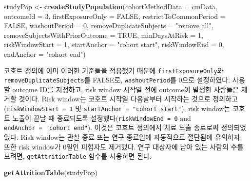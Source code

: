 \documentclass[11pt]{book}
\newenvironment{Shaded}{\begin{snugshade}}{\end{snugshade}}
\newcommand{\KeywordTok}[1]{\textcolor[rgb]{0.13,0.29,0.53}{\textbf{#1}}}
\newcommand{\DataTypeTok}[1]{\textcolor[rgb]{0.13,0.29,0.53}{#1}}
\newcommand{\DecValTok}[1]{\textcolor[rgb]{0.00,0.00,0.81}{#1}}
\newcommand{\StringTok}[1]{\textcolor[rgb]{0.31,0.60,0.02}{#1}}
\newcommand{\OtherTok}[1]{\textcolor[rgb]{0.56,0.35,0.01}{#1}}
\newcommand{\NormalTok}[1]{#1}
\theoremstyle{definition}
\theoremstyle{definition}
\theoremstyle{definition}
\theoremstyle{remark}
\begin{document}
\begin{Shaded}
\begin{Highlighting}[]
\NormalTok{studyPop <-}\StringTok{ }\KeywordTok{createStudyPopulation}\NormalTok{(}\DataTypeTok{cohortMethodData =}\NormalTok{ cmData,}
                                  \DataTypeTok{outcomeId =} \DecValTok{3}\NormalTok{,}
                                  \DataTypeTok{firstExposureOnly =} \OtherTok{FALSE}\NormalTok{,}
                                  \DataTypeTok{restrictToCommonPeriod =} \OtherTok{FALSE}\NormalTok{,}
                                  \DataTypeTok{washoutPeriod =} \DecValTok{0}\NormalTok{,}
                                  \DataTypeTok{removeDuplicateSubjects =} \StringTok{"remove all"}\NormalTok{,}
                                  \DataTypeTok{removeSubjectsWithPriorOutcome =} \OtherTok{TRUE}\NormalTok{,}
                                  \DataTypeTok{minDaysAtRisk =} \DecValTok{1}\NormalTok{,}
                                  \DataTypeTok{riskWindowStart =} \DecValTok{1}\NormalTok{,}
                                  \DataTypeTok{startAnchor =} \StringTok{"cohort start"}\NormalTok{,}
                                  \DataTypeTok{riskWindowEnd =} \DecValTok{0}\NormalTok{,}
                                  \DataTypeTok{endAnchor =} \StringTok{"cohort end"}\NormalTok{)}
\end{Highlighting}
\end{Shaded}

코호트 정의에 이미 이러한 기준들을 적용했기 때문에
\texttt{firstExposureOnly}와 \texttt{removeDuplicateSubjects}를 FALSE로,
\texttt{washoutPeriod}를 0으로 설정하였다. 사용할 outcome ID를 지정하고,
risk window 시작일 전에 outcome이 발생한 사람들은 제거할 것이다. Risk
window는 코호트 시작일 다음날부터 시작하는 것으로
정의하고(\texttt{riskWindowStart\ =\ 1} 및
\texttt{startAnchor\ =\ "cohort\ start"}), risk window는 코호트 노출이
끝날 때 종료되도록 설정했다(\texttt{riskWindowEnd\ =\ 0} and
\texttt{endAnchor\ =\ "cohort\ end"}). 이것은 코호트 정의에서 치료 노출
종료로써 정의되었었다. Risk window는 관찰 종료 또는 연구 종료일에
자동적으로 절단됨에 유의하자. 또한 risk window가 0일인 피험자도
제거했다. 연구 대상자에 남아 있는 사람의 수를 보려면,
\texttt{getAttritionTable} 함수를 사용하면 된다.

\begin{Shaded}
\begin{Highlighting}[]
\KeywordTok{getAttritionTable}\NormalTok{(studyPop)}
\end{Highlighting}
\end{Shaded}
\end{document}
